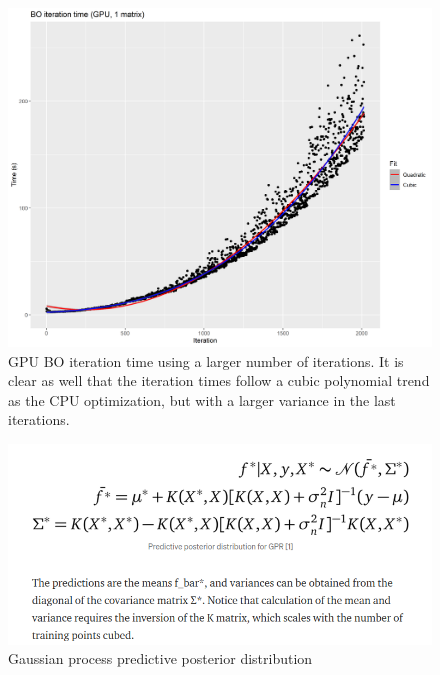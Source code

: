 \begin{figure}[h!]
\centering
\includegraphics[width=\textwidth]{figures/bo_time_gpu_long}
\decoRule
\caption[GPU BO iteration time (2)]{GPU BO iteration time using a larger number of iterations. It is clear as well that the iteration times follow a cubic polynomial trend as the CPU optimization, but with a larger variance in the last iterations.}
\label{fig:bo_time_gpu_long}
\end{figure}

\begin{figure}[h!]
\centering
\includegraphics[width=\textwidth]{figures/gaussian_process_regression}
\decoRule
\caption[Gaussian process predictive posterior distribution]{Gaussian process predictive posterior distribution}
\label{fig:gaussian_process_regression}
\end{figure}

